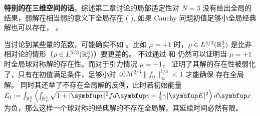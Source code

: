 \textbf{特别的在三维空间的话}，综述第二章讨论的局部适定性对 $N=3$ 没有给出全局的结果，弱解在相当弱的意义下全局存在 ( \cite*{arsenev_global_1975, abdallah_weak_1994} ), 如果 Cauchy 问题初值足够小全局经典解也可以存在， \citet*{bardos1985global}。





当讨论到某些量的范数，\eqrvp 可能确实不如 \eqvp。比如 $\mu=+1$ 时，$\rho\in L^{4/3}({\mathbb{R}}_{x}^{3})$ 是比非相对论的情形（$\rho\in L^{5/3}({\mathbb{R}}_{x}^{3})$）要更差的。 不过通过 \cite*{batt1977global} 和 \cite*{wollman-1980-symmetric} 
仍然可以证明当 $\mu=+1$ 时全局球对称解的存在性。而对于引力情况 $\mu=-1$，\cite*{glassey_symmetric_1985} 证明了其解的存在性被弱化了，只有在初值满足条件，足够小时 $40\mathcal{M}^{2/3}\|f_0\|_\infty^{1/3}<1$ 才能确保 \eqrvp 存在全局解。 同时其还举了不存在全局解的反例，此时若初始能量 $\mathcal{E}_0:=\int_{\bbRx}\left\langle\int_{\bbRv} \sqrt{1+|\vect{v}|^{2}} f d \vv+\frac{1}{2} \gamma|\vE|^{2}\right\rangle d \vect{x}$ 为负，那么这样一个球对称的经典解的不存在全局解，其延续时间必然有限。 

